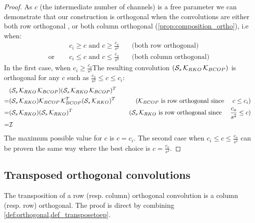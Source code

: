         \begin{proof}
        As $c$ (the intermediate number of channels) is a free parameter we can demonstrate that our construction is orthogonal when  the convolutions are either both row orthogonal , or both column orthogonal (\cref{prop:composition_ortho}), i.e when:
        \begin{align*}
                              & c_i \geq c \text{  and  } c \geq \frac{c_o}{s^2} & \quad \text{(both row orthogonal)}\\
            \text{ or } \quad & c_i \leq c \text{  and  } c \leq \frac{c_o}{s^2} & \quad \text{(both column orthogonal)}
        \end{align*}
        In the first case, when $ c_i \geq \frac{c_o}{s^2}$The resulting convolution $(\mathcal{S}_{s} \, \mathcal{K}_{RKO} \, \mathcal{K}_{BCOP})$ is orthogonal for any $c$ such as  $ \frac{c_o}{s^2} \leq c \leq c_i$:
        \begin{align*}
            &(\mathcal{S}_{s} \, \mathcal{K}_{RKO} \, \mathcal{K}_{BCOP})(\mathcal{S}_{s} \, \mathcal{K}_{RKO} \, \mathcal{K}_{BCOP})^T \\
            = &(\mathcal{S}_{s} \, \mathcal{K}_{RKO})\mathcal{K}_{BCOP} \, \mathcal{K}_{BCOP}^T(\mathcal{S}_{s} \, \mathcal{K}_{RKO})^T & \quad (\mathcal{K}_{BCOP} \text{ is row orthogonal since } \quad c\leq c_i)\\
            = & (\mathcal{S}_{s} \, \mathcal{K}_{RKO})(\mathcal{S}_{s} \, \mathcal{K}_{RKO})^T & \quad (\mathcal{S}_{s} \, \mathcal{K}_{RKO} \text{ is row orthogonal since } \quad \frac{c_o}{s^2} \leq c)\\
            = & \mathcal{I} \\
        \end{align*}
        The maximum possible value for $c$ is $c=c_i$. 
        The second case when $c_i \leq c \leq \frac{c_o}{s^2}$ can be proven the same way where the best choice is $c=\frac{c_o}{s^2}$.
        \end{proof}
\subsection{Transposed orthogonal convolutions}
\label{sec:ap_proof_transposed}
The transposition of a row (resp. column) orthogonal convolution is a column (resp. row) orthogonal. The proof is direct by combining \cref{def:orthogonal,def_transposetoep}.

